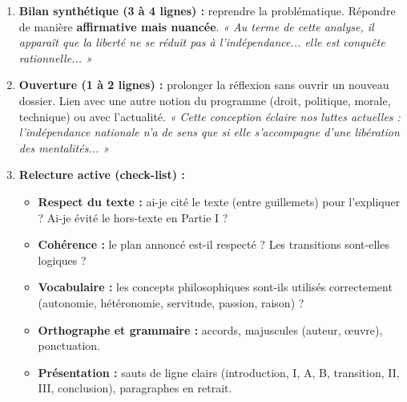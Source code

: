 \documentclass[11pt]{article}
\begin{document}
\begin{methode}
\begin{enumerate}
    \item \textbf{Bilan synthétique (3 à 4 lignes) :} reprendre la problématique. Répondre de manière \textbf{affirmative mais nuancée}. \emph{« Au terme de cette analyse, il apparaît que la liberté ne se réduit pas à l'indépendance... elle est conquête rationnelle... »}
    \item \textbf{Ouverture (1 à 2 lignes) :} prolonger la réflexion sans ouvrir un nouveau dossier. Lien avec une autre notion du programme (droit, politique, morale, technique) ou avec l'actualité. \emph{« Cette conception éclaire nos luttes actuelles : l'indépendance nationale n'a de sens que si elle s'accompagne d'une libération des mentalités... »}
    \item \textbf{Relecture active (check-list) :}
    \begin{itemize}
        \item \textbf{Respect du texte :} ai-je cité le texte (entre guillemets) pour l'expliquer ? Ai-je évité le hors-texte en Partie I ?
        \item \textbf{Cohérence :} le plan annoncé est-il respecté ? Les transitions sont-elles logiques ?
        \item \textbf{Vocabulaire :} les concepts philosophiques sont-ils utilisés correctement (autonomie, hétéronomie, servitude, passion, raison) ?
        \item \textbf{Orthographe et grammaire :} accords, majuscules (auteur, œuvre), ponctuation.
        \item \textbf{Présentation :} sauts de ligne clairs (introduction, I, A, B, transition, II, III, conclusion), paragraphes en retrait.
    \end{itemize}
\end{enumerate}
\end{methode}
\end{document}
